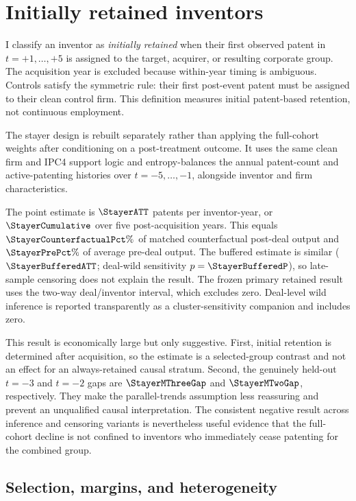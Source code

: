 \documentclass[10pt,a4paper]{article}
\begin{document}
\section{Initially retained inventors}

I classify an inventor as \emph{initially retained} when their first observed
patent in \(t=+1,\ldots,+5\) is assigned to the target, acquirer, or resulting
corporate group. The acquisition year is excluded because within-year timing
is ambiguous. Controls satisfy the symmetric rule: their first post-event
patent must be assigned to their clean control firm. This definition measures
initial patent-based retention, not continuous employment.

The stayer design is rebuilt separately rather than applying the full-cohort
weights after conditioning on a post-treatment outcome. It uses the same clean
firm and IPC4 support logic and entropy-balances the annual patent-count and
active-patenting histories over \(t=-5,\ldots,-1\), alongside inventor and firm
characteristics.



The point estimate is \(\StayerATT\) patents per inventor-year, or
\(\StayerCumulative\) over five post-acquisition years. This equals
\(\StayerCounterfactualPct\%\) of matched counterfactual post-deal output and
\(\StayerPrePct\%\) of average pre-deal output. The buffered estimate is
similar (\(\StayerBufferedATT\); deal-wild sensitivity
\(p=\StayerBufferedP\)), so late-sample censoring does not explain the result.
The frozen primary retained result uses the two-way deal/inventor interval,
which excludes zero. Deal-level wild inference is reported transparently as a
cluster-sensitivity companion and includes zero.

This result is economically large but only suggestive. First, initial
retention is determined after acquisition, so the estimate is a
selected-group contrast and not an effect for an always-retained causal
stratum. Second, the genuinely held-out \(t=-3\) and \(t=-2\) gaps are
\(\StayerMThreeGap\) and \(\StayerMTwoGap\), respectively. They make the
parallel-trends assumption less reassuring and prevent an unqualified causal
interpretation. The consistent negative result across inference and
censoring variants is nevertheless useful evidence that the full-cohort
decline is not confined to inventors who immediately cease patenting for the
combined group.

\subsection{Selection, margins, and heterogeneity}
\end{document}
